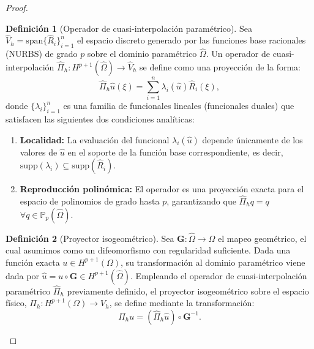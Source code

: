 \documentclass[11pt]{book}
\theoremstyle{plain} %
\theoremstyle{definition} %
\newtheorem*{defin}{Definición} %
\theoremstyle{definition} %
\begin{document}
\begin{proof}
    \begin{defin}
        [Operador de cuasi-interpolación paramétrico]
        Sea $\hat{V}_h = \text{span}\{ \hat{R}_i \}_{i=1}^n$ el espacio discreto generado por las funciones base racionales (NURBS) de grado $p$ sobre el dominio paramétrico $\hat{\Omega}$.
        Un operador de cuasi-interpolación $\hat{\Pi}_h: H^{p+1}(\hat{\Omega}) \to \hat{V}_h$ se define como una proyección de la forma:$$\hat{\Pi}_h \hat{u}(\xi) = \sum_{i=1}^n \lambda_i(\hat{u}) \hat{R}_i(\xi),$$
        donde $\{ \lambda_i \}_{i=1}^n$ es una familia de funcionales lineales (funcionales duales) que satisfacen las siguientes dos condiciones analíticas:
        \begin{enumerate}
            \item \textbf{Localidad:} La evaluación del funcional $\lambda_i(\hat{u})$ depende únicamente de los valores de $\hat{u}$ en el soporte de la función base correspondiente, es decir,
                    $\text{supp}(\lambda_i) \subseteq \text{supp}(\hat{R}_i)$.
            \item \textbf{Reproducción polinómica:} El operador es una proyección exacta para el espacio de polinomios de grado hasta $p$, garantizando que $\hat{\Pi}_h q = q$
                     $\forall q \in \mathbb{P}_p(\hat{\Omega})$.
        \end{enumerate}
    \end{defin}
    
    \begin{defin}[Proyector isogeométrico]
        Sea $\mathbf{G}: \hat{\Omega} \to \Omega$ el mapeo geométrico, el cual asumimos como un difeomorfismo con regularidad
        suficiente. Dada una función exacta $u \in H^{p+1}(\Omega)$, su transformación al dominio paramétrico viene
        dada por $\hat{u} = u \circ \mathbf{G} \in H^{p+1}(\hat{\Omega})$. Empleando el operador de cuasi-interpolación paramétrico
        $\hat{\Pi}_h$ previamente definido, el proyector isogeométrico sobre el espacio físico, $\Pi_h: H^{p+1}(\Omega) \to V_h$,
        se define mediante la transformación:
        $$\Pi_h u = (\hat{\Pi}_h \hat{u}) \circ \mathbf{G}^{-1}.$$
    \end{defin}


\end{proof}
\end{document}
